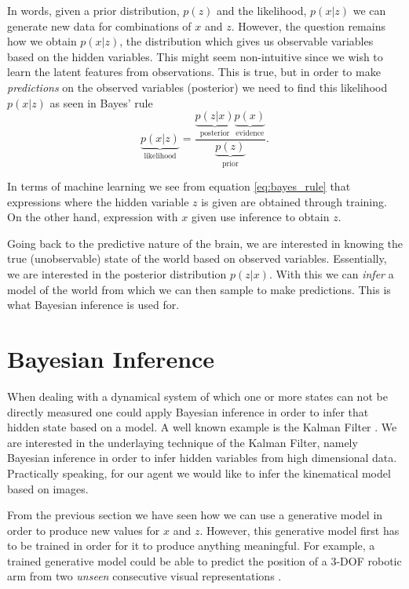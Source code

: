 \documentclass[main.tex]{subfiles}
\begin{document}
In words, given a prior distribution, $p(z)$ and the likelihood, $p(x|z)$ we can generate new data for combinations of $x$ and $z$. However, the question remains how we obtain $p(x|z)$, the distribution which gives us observable variables based on the hidden variables. This might seem non-intuitive since we wish to learn the latent features from observations. This is true, but in order to make \textit{predictions} on the observed variables (posterior) we need to find this likelihood $p(x|z)$ as seen in Bayes' rule
\begin{equation}
  \label{eq:bayes_rule}
  \underbrace{p(x|z)}_{\text{likelihood}} = \dfrac{\underbrace{p(z|x)}_{\text{posterior}} \underbrace{p(x)}_\text{evidence}}{\underbrace{p(z)}_\text{prior}}.
\end{equation}

In terms of machine learning we see from equation \eqref{eq:bayes_rule} that expressions where the hidden variable $z$ is given are obtained through training. On the other hand, expression with $x$ given use inference to obtain $z$.

Going back to the predictive nature of the brain, we are interested in knowing the true (unobservable) state of the world based on observed variables. Essentially, we are interested in the posterior distribution $p(z|x)$. With this we can \textit{infer} a model of the world from which we can then sample to make predictions. This is what Bayesian inference is used for.

\section{Bayesian Inference}
When dealing with a dynamical system of which one or more states can not be directly measured one could apply Bayesian inference in order to infer that hidden state based on a model. A well known example is the Kalman Filter \cite{bishop2001introduction}. We are interested in the underlaying technique of the Kalman Filter, namely Bayesian inference in order to infer hidden variables from high dimensional data. Practically speaking, for our agent we would like to infer the kinematical model based on images.

From the previous section we have seen how we can use a generative model in order to produce new values for $x$ and $z$. However, this generative model first has to be trained in order for it to produce anything meaningful. For example, a trained generative model could be able to predict the position of a 3-DOF robotic arm from two \textit{unseen} consecutive visual representations \cite{watter2015embed}.
\end{document}
